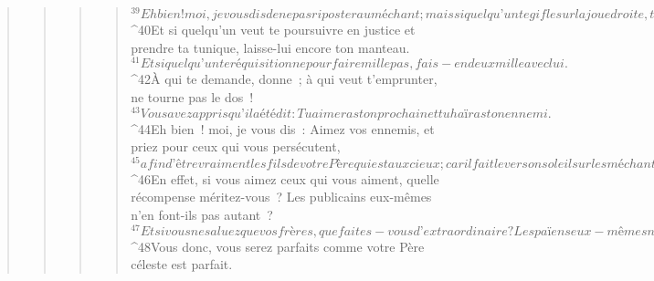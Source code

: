 \begin{verse}
\begin{verse}
\begin{verse}
\begin{verse}
${}^{39}Eh bien ! moi, je vous dis de ne pas riposter au méchant ; mais si quelqu’un te gifle sur la joue droite, tends-lui encore l’autre. 
${}^{40}Et si quelqu’un veut te poursuivre en justice et prendre ta tunique, laisse-lui encore ton manteau. 
${}^{41}Et si quelqu’un te réquisitionne pour faire mille pas, fais-en deux mille avec lui. 
${}^{42}À qui te demande, donne ; à qui veut t’emprunter, ne tourne pas le dos !
${}^{43}Vous avez appris qu’il a été dit : Tu aimeras ton prochain et tu haïras ton ennemi. 
${}^{44}Eh bien ! moi, je vous dis : Aimez vos ennemis, et priez pour ceux qui vous persécutent, 
${}^{45}afin d’être vraiment les fils de votre Père qui est aux cieux ; car il fait lever son soleil sur les méchants et sur les bons, il fait tomber la pluie sur les justes et sur les injustes. 
${}^{46}En effet, si vous aimez ceux qui vous aiment, quelle récompense méritez-vous ? Les publicains eux-mêmes n’en font-ils pas autant ? 
${}^{47}Et si vous ne saluez que vos frères, que faites-vous d’extraordinaire ? Les païens eux-mêmes n’en font-ils pas autant ? 
${}^{48}Vous donc, vous serez parfaits comme votre Père céleste est parfait.
      

\end{verse}
\end{verse}
\end{verse}
\end{verse}
